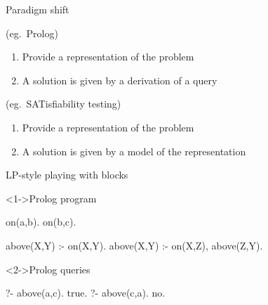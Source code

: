 \begin{frame}{Paradigm shift}
  \bigskip

  \begin{description}

  \item<1-2>[Theorem Proving based approach] (eg.\ Prolog)
    \begin{enumerate}
    \item Provide a representation of the problem

    \item A solution is given by a \alert{derivation} of a query
    \end{enumerate}
    \bigskip

  \item<1>[Model Generation based approach] (eg.\ SATisfiability testing)
    \begin{enumerate}
    \item Provide a representation of the problem

    \item A solution is given by a \alert{model} of the representation
    \end{enumerate}
  \end{description}
\end{frame}
\begin{frame}[fragile]{LP-style playing with blocks}
  \begin{block}<1->{Prolog program}%
    \small\vspace{-2ex}%
\begin{semiverbatim}
on(a,b).
on(b,c).

above(X,Y) :- on(X,Y).
above(X,Y) :- on(X,Z), above(Z,Y).
\end{semiverbatim}%
    \vspace{-1ex}%
  \end{block}
  \begin{block}<2->{Prolog queries\phantom{)}}%
    \small\vspace{-2ex}%
\begin{semiverbatim}
?- above(a,c).
true.
\pause[3]
?- above(c,a).
no.
\end{semiverbatim}
    \vspace{-1ex}%
  \end{block}
\end{frame}
